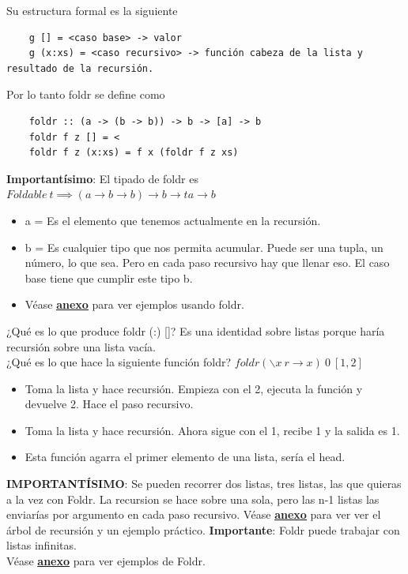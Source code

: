 \documentclass[10pt,a4paper]{article}
\begin{document}
Su estructura formal es la siguiente 
\begin{lstlisting}
    g [] = <caso base> -> valor 
    g (x:xs) = <caso recursivo> -> función cabeza de la lista y resultado de la recursión.
\end{lstlisting}
Por lo tanto foldr se define como
\begin{lstlisting}
    foldr :: (a -> (b -> b)) -> b -> [a] -> b 
    foldr f z [] = <
    foldr f z (x:xs) = f x (foldr f z xs)
\end{lstlisting}
\textbf{Importantísimo}: El tipado de foldr es $ Foldable \ t \implies (a \rightarrow b \rightarrow b) \rightarrow b \rightarrow t a \rightarrow b $
\begin{itemize}
    \item a = Es el elemento que tenemos actualmente en la recursión.
    \item b = Es cualquier tipo que nos permita acumular. Puede ser una tupla, un número, lo que sea. Pero en cada paso recursivo hay que llenar eso. El caso base tiene que cumplir este tipo b.
    \item Véase \hyperref[subsec:foldr_ejercicios]{\underline{\textbf{anexo}}} para ver ejemplos usando foldr.
\end{itemize}
¿Qué es lo que produce foldr (:) []? Es una identidad sobre listas porque haría recursión sobre una lista vacía. \\
¿Qué es lo que hace la siguiente función foldr? $ foldr(\backslash x \ r \rightarrow x) \ 0 \ [1, 2]$ 
\begin{itemize}
    \item Toma la lista y hace recursión. Empieza con el 2, ejecuta la función y devuelve 2. Hace el paso recursivo.
    \item Toma la lista y hace recursión. Ahora sigue con el 1, recibe 1 y la salida es 1. 
    \item Esta función agarra el primer elemento de una lista, sería el head.
\end{itemize}
\textbf{IMPORTANTÍSIMO}: Se pueden recorrer dos listas, tres listas, las que quieras a la vez con Foldr. La recursion se hace sobre una sola, pero las n-1 listas las enviarías por argumento en cada paso recursivo. Véase \hyperref[subsec:foldr_armar_pares]{\textbf{\underline{anexo}}} para ver ver el árbol de recursión y un ejemplo práctico. 
\textbf{Importante}: Foldr puede trabajar con listas infinitas. \\
Véase \hyperref[subsec:foldr_ex]{\textbf{\underline{anexo}}} para ver ejemplos de Foldr. \\
\end{document}
